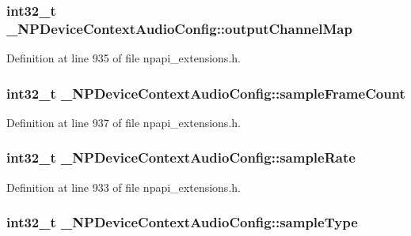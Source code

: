 \hypertarget{struct___n_p_device_context_audio_config_adc7b8d1ae23a27b833dd9816ca76c9b2}{
\subsubsection[{outputChannelMap}]{\setlength{\rightskip}{0pt plus 5cm}int32\_\-t {\bf \_\-NPDeviceContextAudioConfig::outputChannelMap}}}
\label{struct___n_p_device_context_audio_config_adc7b8d1ae23a27b833dd9816ca76c9b2}


Definition at line 935 of file npapi\_\-extensions.h.

\hypertarget{struct___n_p_device_context_audio_config_a9845d796ed525af2eef523a8246d5fff}{
\subsubsection[{sampleFrameCount}]{\setlength{\rightskip}{0pt plus 5cm}int32\_\-t {\bf \_\-NPDeviceContextAudioConfig::sampleFrameCount}}}
\label{struct___n_p_device_context_audio_config_a9845d796ed525af2eef523a8246d5fff}


Definition at line 937 of file npapi\_\-extensions.h.

\hypertarget{struct___n_p_device_context_audio_config_ae8f165b45aa2bb33a84d4e62c320afef}{
\subsubsection[{sampleRate}]{\setlength{\rightskip}{0pt plus 5cm}int32\_\-t {\bf \_\-NPDeviceContextAudioConfig::sampleRate}}}
\label{struct___n_p_device_context_audio_config_ae8f165b45aa2bb33a84d4e62c320afef}


Definition at line 933 of file npapi\_\-extensions.h.

\hypertarget{struct___n_p_device_context_audio_config_a72368bc2db5c560fcfcec9f048fe7e93}{
\subsubsection[{sampleType}]{\setlength{\rightskip}{0pt plus 5cm}int32\_\-t {\bf \_\-NPDeviceContextAudioConfig::sampleType}}}
\label{struct___n_p_device_context_audio_config_a72368bc2db5c560fcfcec9f048fe7e93}


